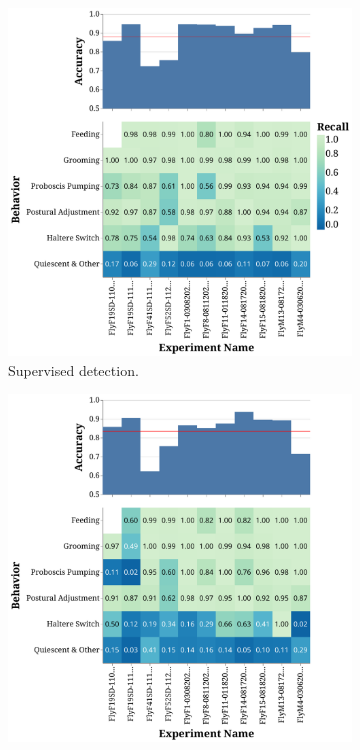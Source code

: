 \begin{figure}[t]
	\centering
	\begin{subfigure}[b]{0.495\linewidth}
		\centering\includegraphics[width=\linewidth]{figures/OutliningPerformance-Supervised.pdf}
		\caption{Supervised detection.}
	\end{subfigure}%
	\hfill
	\begin{subfigure}[b]{0.495\linewidth}
		\centering\includegraphics[width=\linewidth]{figures/OutliningPerformance-Unsupervised.pdf}

\end{subfigure}
\end{figure}
